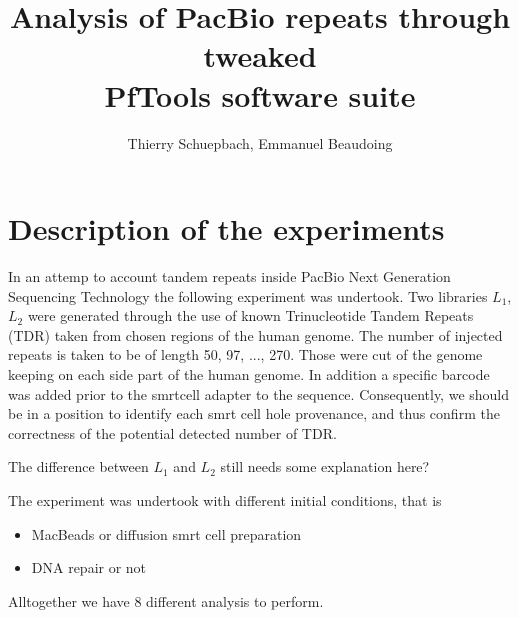 \documentclass{article}\usepackage[]{graphicx}\usepackage[]{color}
\title{Analysis of PacBio repeats through tweaked\\ PfTools software suite}
\author{Thierry Schuepbach, Emmanuel Beaudoing}
\begin{document}
\maketitle

\section{Description of the experiments}
In an attemp to account tandem repeats inside PacBio Next Generation Sequencing Technology the following experiment was undertook.
Two libraries $L_1$, $L_2$ were generated through the use of known Trinucleotide Tandem Repeats (TDR) taken from chosen regions of the human genome. The number of injected repeats is taken to be of length 50, 97, ..., 270.
Those were cut of the genome keeping on each side part of the human genome. In addition a specific barcode
was added prior to the smrtcell adapter to the sequence.
Consequently, we should be in a position to identify each smrt cell hole provenance, and thus confirm the correctness of the potential detected number of TDR.

The difference between $L_1$ and $L_2$ still needs some explanation here?

The experiment was undertook with different initial conditions, that is
\begin{itemize}
  \item MacBeads or diffusion smrt cell preparation
  \item DNA repair or not
\end{itemize}

Alltogether we have $8$ different analysis to perform.
\end{document}
